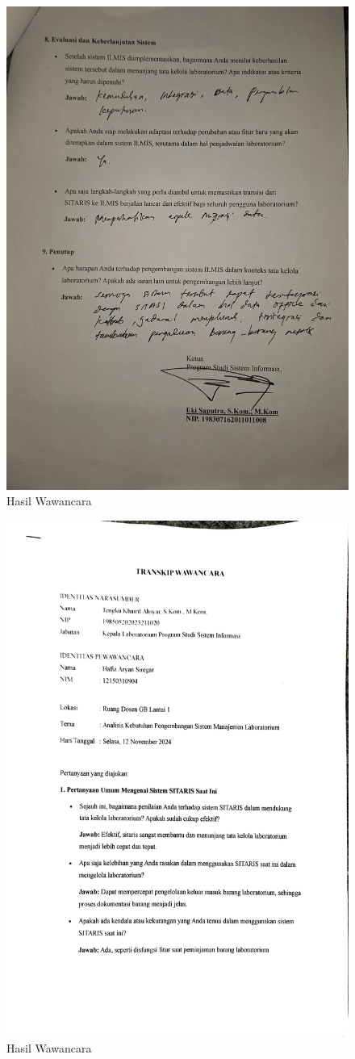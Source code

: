 \begin{figure}[h]
	\centering
	\includegraphics[width=0.82\linewidth]{konten/gambar/wawancara/5.jpg}
	\caption{Hasil Wawancara}
	\label{fig:hasil-wawancara}
\end{figure}
\begin{figure}[h]
	\centering
	\includegraphics[width=0.82\linewidth]{konten/gambar/wawancara/wawancara_1.jpg}
	\caption{Hasil Wawancara}
	\label{fig:hasil-wawancara}
\end{figure}

